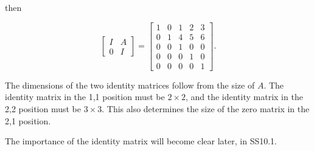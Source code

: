 then

\[\left[\begin{array}{cc}I&A\\ 0&I\end{array}\right]=\left[\begin{array}{cccc}1&0&1&2&3\\ 0&1&4&5&6\\ 0&0&1&0&0\\ 0&0&0&1&0\\ 0&0&0&0&1\end{array}\right].\]

The dimensions of the two identity matrices follow from the size of \(A\). The identity matrix in the 1,1 position must be \(2\times 2\), and the identity matrix in the 2,2 position must be \(3\times 3\). This also determines the size of the zero matrix in the 2,1 position.

The importance of the identity matrix will become clear later, in SS10.1.

